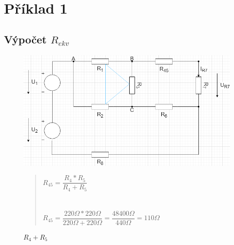 \section{Příklad 1}
\subsection{Výpočet $R_{ekv}$}

\begin{figure}[H]
    \centering
    \includegraphics[scale=0.5]{picturesFor1Uloha/1.png}
    \caption{$R_4 + R_5$}
    \label{fig:Paralel_resistor_R45}
    \begin{quote}
    \centering
    $R_{45} =  \dfrac{R_4 * R_5}{R_4 + R_5} $  \\~\\~\\
    $R_{45} =  \dfrac{220\Omega * 220\Omega}{220\Omega + 220\Omega} = 
    \dfrac{48400\Omega}{440\Omega} = 110\Omega$
    \end{quote}
\end{figure}

